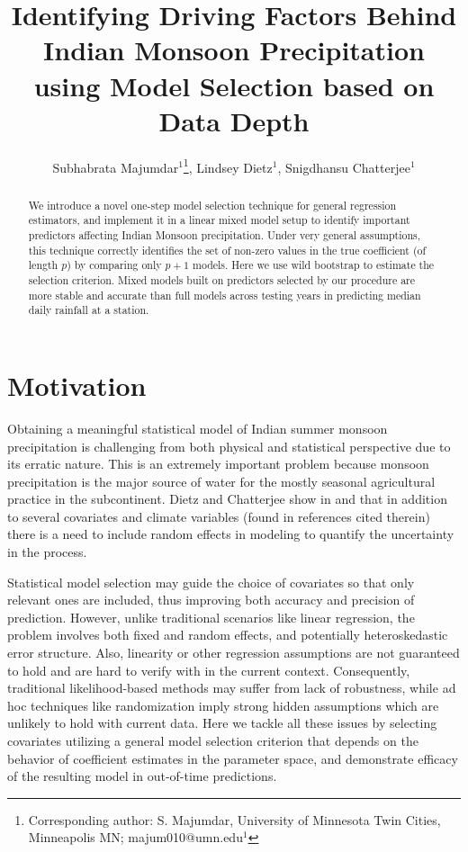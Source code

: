 \documentclass[11pt,twocolumn,twoside]{IEEEtran}
\begin{document}
\title{\vspace{0.2in}\sc Identifying Driving Factors Behind Indian Monsoon Precipitation using Model Selection based on Data Depth}
\author{Subhabrata Majumdar$^1$\thanks{Corresponding author: S. Majumdar, University of Minnesota Twin Cities, Minneapolis MN; majum010@umn.edu$^1$}, Lindsey Dietz$^1$, Snigdhansu Chatterjee$^1$}

\maketitle
\thispagestyle{fancy}

\begin{abstract}
We introduce a novel one-step model selection technique for general regression estimators, and implement it in a linear mixed model setup to identify important predictors affecting Indian Monsoon precipitation. Under very general assumptions, this technique correctly identifies the set of non-zero values in the true coefficient (of length $p$) by comparing only $p+1$ models. Here we use wild bootstrap to estimate the selection criterion. Mixed models built on predictors selected by our procedure are more stable and accurate than full models across testing years in predicting median daily rainfall at a station.
\end{abstract}

\section{Motivation}

Obtaining a meaningful statistical model of Indian summer monsoon precipitation is challenging from both physical and statistical perspective due to its erratic nature.  This is an extremely important problem because monsoon precipitation is the major source of water for the mostly seasonal agricultural practice in the subcontinent. Dietz and Chatterjee show in\cite{Dietz2014} and \cite{Dietz2015Chapter} that in addition to several covariates and climate variables (found in references cited therein) there is a need to include random effects in modeling to quantify the uncertainty in the process.

Statistical model selection may guide the choice of covariates so that only relevant ones are included, thus improving both accuracy and precision of prediction. However, unlike traditional scenarios like linear regression, the problem involves both fixed and random effects, and potentially heteroskedastic error structure. Also, linearity or other regression assumptions are not guaranteed to hold and are hard to verify with in the current context. Consequently, traditional likelihood-based methods may suffer from lack of robustness, while ad hoc techniques like randomization imply strong hidden assumptions which are unlikely to hold with current data. Here we tackle all these issues by selecting covariates utilizing a general model selection criterion that depends on the behavior of coefficient estimates in the parameter space, and demonstrate efficacy of the resulting model in out-of-time predictions.
\end{document}
